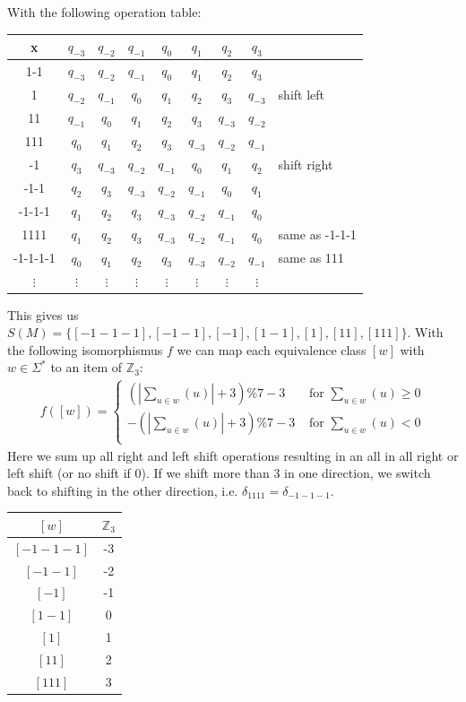 \documentclass[a4paper,12pt,numbers=noenddot]{scrreport}
\begin{document}
With the following operation table:
\begin{center}
\begin{tabular}{c|ccccccc|l}
    x & $q_{-3}$ & $q_{-2}$ & $q_{-1}$ & $q_{0}$ & $q_{1}$ & $q_{2}$ & $q_3$   \\ \hline
    1-1 & $q_{-3}$ & $q_{-2}$ & $q_{-1}$ & $q_{0}$ & $q_{1}$ & $q_{2}$ & $q_3$   \\ \hline
    1 & $q_{-2}$ & $q_{-1}$ & $q_{0}$ & $q_{1}$ & $q_{2}$ & $q_{3}$ & $q_{-3}$ & shift left  \\ 
    11 & $q_{-1}$ & $q_{0}$ & $q_{1}$ & $q_{2}$ & $q_{3}$ & $q_{-3}$ & $q_{-2}$   \\ 
    111 & $q_{0}$ & $q_{1}$ & $q_{2}$ & $q_{3}$ & $q_{-3}$ & $q_{-2}$ & $q_{-1}$   \\  \hline
    -1 & $q_{3}$ & $q_{-3}$ & $q_{-2}$ & $q_{-1}$ & $q_{0}$ & $q_{1}$ & $q_{2}$  & shift right \\ 
    -1-1 & $q_{2}$ & $q_{3}$ & $q_{-3}$ & $q_{-2}$ & $q_{-1}$ & $q_{0}$ & $q_{1}$   \\ 
    -1-1-1 & $q_{1}$ & $q_{2}$ & $q_{3}$ & $q_{-3}$ & $q_{-2}$ & $q_{-1}$ & $q_{0}$   \\ \hline
    1111 & $q_{1}$ & $q_{2}$ & $q_{3}$ & $q_{-3}$ & $q_{-2}$ & $q_{-1}$ & $q_{0}$ & same as -1-1-1  \\ 
    -1-1-1-1 & $q_{0}$ & $q_{1}$ & $q_{2}$ & $q_{3}$ & $q_{-3}$ & $q_{-2}$ & $q_{-1}$ & same as 111  \\  \hline
$\vdots$ & $\vdots$ & $\vdots$& $\vdots$& $\vdots$& $\vdots$& $\vdots$ & $\vdots$ & \\
\end{tabular}
\end{center}

This gives us $S(M) = \{[-1-1-1], [-1-1], [-1], [1-1], [1], [11], [111]\}$.
With the following isomorphismus $f$ we can map each equivalence class $[w]$ with $w \in \Sigma^*$ to an item of $\mathbb{Z}_3$:
\begin{align*}
    f([w]) = 
    \begin{cases}
        (|\sum_{u \in w}(u)| + 3) \% 7 - 3 & \text{ for } \sum_{u \in w}(u) \geq 0 \\
        - (|\sum_{u \in w}(u)| + 3) \% 7 - 3 & \text{ for } \sum_{u \in w}(u) < 0 \\
    \end{cases}
\end{align*}
Here we sum up all right and left shift operations resulting in an all in all right or left shift (or no shift if 0).
If we shift more than 3 in one direction,  we switch back to shifting in the other direction, i.e. $\delta_{1111} = \delta_{-1-1-1}$.

\begin{center}
\begin{tabular}{c|c}
    $[w]$ &  $\mathbb{Z}_3$ \\ \hline
    $[-1-1-1]$ & -3\\ 
    $[-1-1]$ & -2\\ 
    $[-1]$ & -1\\ 
    $[1-1]$ & 0\\ 
    $[1]$ & 1\\ 
    $[11]$ & 2\\ 
    $[111]$ & 3\\ 
\end{tabular}
\end{center}
\end{document}
